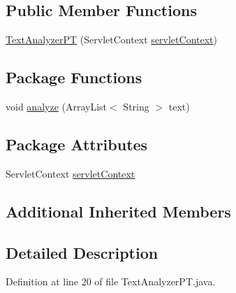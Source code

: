 \subsection*{Public Member Functions}
\begin{DoxyCompactItemize}
\item 
\hyperlink{classbr_1_1usp_1_1cata_1_1util_1_1_text_analyzer_p_t_a89d50c06282aa8f1b2c498b3ebe6dbe6}{Text\+Analyzer\+P\+T} (Servlet\+Context \hyperlink{classbr_1_1usp_1_1cata_1_1util_1_1_text_analyzer_p_t_a06e2cb17d3b876c720abc8f3d231f354}{servlet\+Context})
\end{DoxyCompactItemize}
\subsection*{Package Functions}
\begin{DoxyCompactItemize}
\item 
void \hyperlink{classbr_1_1usp_1_1cata_1_1util_1_1_text_analyzer_p_t_aa55f7b6703402d9cb9dd40abb915622b}{analyze} (Array\+List$<$ String $>$ text)
\end{DoxyCompactItemize}
\subsection*{Package Attributes}
\begin{DoxyCompactItemize}
\item 
Servlet\+Context \hyperlink{classbr_1_1usp_1_1cata_1_1util_1_1_text_analyzer_p_t_a06e2cb17d3b876c720abc8f3d231f354}{servlet\+Context}
\end{DoxyCompactItemize}
\subsection*{Additional Inherited Members}


\subsection{Detailed Description}


Definition at line 20 of file Text\+Analyzer\+P\+T.\+java.



